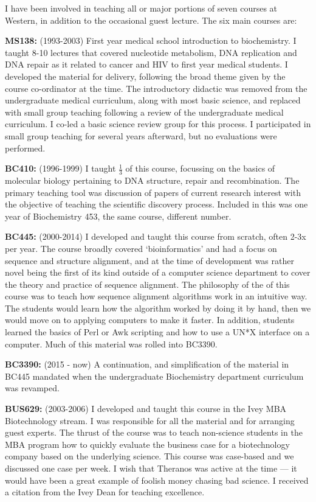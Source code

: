 \documentclass[11pt]{article}
\begin{document}
I have been involved in teaching all or major portions of seven courses at Western, in addition to the occasional guest lecture. The six main courses are:
\begin{description}
\item{\textbf{MS138:}} (1993-2003) First year medical school introduction to biochemistry. I taught 8-10 lectures that covered nucleotide metabolism, DNA replication and DNA repair as it related to cancer and HIV to first year medical students. I developed the material for delivery, following the broad theme given by the course co-ordinator at the time. The introductory didactic was removed from the undergraduate medical curriculum, along with most basic science, and replaced with small group teaching following a review of the undergraduate medical curriculum. I co-led a basic science review group for this process. I participated in small group teaching for several years afterward, but no evaluations were performed. 
\item{\textbf{BC410:}} (1996-1999) I taught $\frac{1}{3}$ of this course, focussing on the basics of molecular biology pertaining to DNA structure, repair and recombination.  The primary teaching tool was discussion of papers of current research interest with the objective of teaching the scientific discovery process. Included in this was one year of Biochemistry 453, the same course, different number.
\item{\textbf{BC445:}} (2000-2014) I developed and taught this course from scratch, often 2-3x per year. The course broadly covered `bioinformatics' and had a focus on sequence and structure alignment, and at the time of development was rather novel being the first of its kind outside of a computer science department to cover the theory and practice of sequence alignment. The philosophy of the of this course was to teach how sequence alignment algorithms work in an intuitive way. The students would learn how the algorithm worked by doing it by hand, then we would move on to applying computers to make it faster. In addition, students learned the basics of Perl or Awk scripting and how to use a UN*X interface on a computer. Much of this material was rolled into BC3390.   
\item{\textbf{BC3390:}} (2015 - now) A continuation, and simplification of the material in BC445 mandated when the undergraduate Biochemistry department curriculum was revamped.
\item{\textbf{BUS629:}} (2003-2006) I developed and taught this course in the Ivey MBA Biotechnology stream. I was responsible for all the material and for arranging guest experts. The thrust of the course was to teach non-science students in the MBA program how to quickly evaluate the business case for a biotechnology company based on the underlying science. This course was case-based and we discussed one case per week. I wish that Theranos was active at the time --- it would have been a great example of foolish money chasing bad science. I received a citation from the Ivey Dean for teaching excellence.

\end{description}
\end{document}
